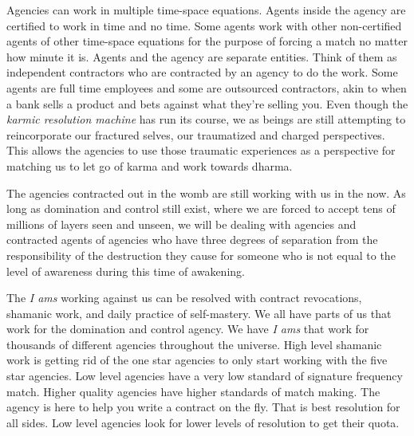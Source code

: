 Agencies can work in multiple time-space equations. Agents inside the
agency are certified to work in time and no time. Some agents work with
other non-certified agents of other time-space equations for the purpose
of forcing a match no matter how minute it is. Agents and the agency are
separate entities. Think of them as independent contractors who are
contracted by an agency to do the work. Some agents are full time
employees and some are outsourced contractors, akin to when a bank sells
a product and bets against what they're selling you. Even though the
\emph{karmic resolution machine} has run its course, we as beings are
still attempting to reincorporate our fractured selves, our traumatized
and charged perspectives. This allows the agencies to use those
traumatic experiences as a perspective for matching us to let go of
karma and work towards dharma.

The agencies contracted out in the womb are still working with us in the
now. As long as domination and control still exist, where we are forced
to accept tens of millions of layers seen and unseen, we will be dealing
with agencies and contracted agents of agencies who have three degrees
of separation from the responsibility of the destruction they cause for
someone who is not equal to the level of awareness during this time of
awakening.

The \emph{I ams} working against us can be resolved with contract
revocations, shamanic work, and daily practice of self-mastery. We all
have parts of us that work for the domination and control agency. We
have \emph{I ams} that work for thousands of different agencies
throughout the universe. High level shamanic work is getting rid of the
one star agencies to only start working with the five star agencies. Low
level agencies have a very low standard of signature frequency match.
Higher quality agencies have higher standards of match making. The
agency is here to help you write a contract on the fly. That is best
resolution for all sides. Low level agencies look for lower levels of
resolution to get their quota.

